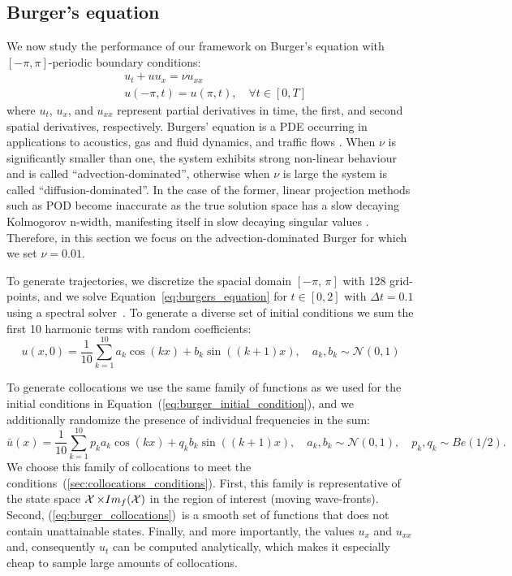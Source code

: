 \subsection{Burger's equation}
\label{sec:burger_eqn}
We now study the performance of our framework on Burger's equation with $[-\pi, \pi]$-periodic boundary conditions:
\begin{equation}
\begin{split}
\label{eq:burgers_equation}
    & u_t  + uu_x = \nu u_{xx} \\
    & u(-\pi, t) = u(\pi, t),\quad \forall t \in [0, T]
\end{split}
\end{equation}
where $u_t$, $u_x$, and $u_{xx}$ represent partial derivatives in time, the first, and second spatial derivatives, respectively. Burgers' equation is a PDE occurring in applications to acoustics, gas and fluid dynamics, and traffic flows \cite{burgers1948mathematical}. When $\nu$ is significantly smaller than one, the system exhibits strong non-linear behaviour and is called ``advection-dominated'', otherwise when $\nu$ is large the system is called ``diffusion-dominated''. 
In the case of the former, linear projection methods such as POD become inaccurate as the true solution space has a slow decaying Kolmogorov n-width, manifesting itself in slow decaying singular values \cite{peherstorfer2022breaking}. Therefore, in this section we focus on the advection-dominated Burger for which we set $\nu = 0.01$.


To generate trajectories, we discretize the spacial domain $[-\pi,\,\pi]$ with 128 grid-points, and we solve Equation~\ref{eq:burgers_equation} for $t \in [0, 2]$ with $\Delta t = 0.1$ using a spectral solver~\cite{trefethen2000spectral}. To generate a diverse set of initial conditions we sum the first 10 harmonic terms with random coefficients:
\begin{equation}
    \label{eq:burger_initial_condition}
    u(x, 0) = \frac{1}{10}\sum_{k = 1}^{10} a_k\cos(kx) + b_k\sin((k+1)x), \quad a_k, b_k \sim \mathcal{N}(0, 1)
\end{equation}

To generate collocations we use the same family of functions as we used for the initial conditions in Equation~(\ref{eq:burger_initial_condition}), and we additionally randomize the presence of individual frequencies in the sum:
\begin{equation}
    \label{eq:burger_collocations}
    \bar{u}(x) = \frac{1}{10}\sum_{k = 1}^{10} p_ka_k\cos(kx) + q_kb_k\sin((k+1)x), \quad a_k, b_k \sim \mathcal{N}(0, 1), \quad p_k, q_k \sim Be(1/2).
\end{equation}
We choose this family of collocations to meet the conditions~(\ref{sec:collocations_conditions}). First, this family is representative of the state space $\operatorname{\mathcal{X}}\times Im_f(\operatorname{\mathcal{X}})$ in the region of interest (moving wave-fronts). Second, (\ref{eq:burger_collocations})~is a smooth set of functions that does not contain unattainable states. Finally, and more importantly, the values $u_x$ and $u_{xx}$ and, consequently $u_t$ can be computed analytically, which makes it especially cheap to sample large amounts of collocations. 

